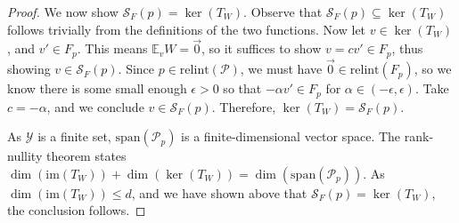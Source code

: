 \documentclass[anon,12pt]{colt2021} %
\newcommand{\Comments}{1}
\newcommand{\mynote}[2]{\ifnum\Comments=1\textcolor{#1}{#2}\fi}
\newcommand{\raf}[1]{\mynote{green}{[RF: #1]}}
\newcommand{\jessie}[1]{\mynote{purple}{[JF: #1]}}
\newcommand{\relint}[1]{\mathrm{relint}(#1)}
\newcommand{\spn}{\mathrm{span}}
\newcommand{\E}{\mathbb{E}}
\renewcommand{\P}{\mathcal{P}}
\newcommand{\Scr}{\mathcal{S}}  %
\newcommand{\Y}{\mathcal{Y}}
\newcommand{\im}{\mathrm{im}}
\begin{document}
\begin{proof}
  We now show $\Scr_F(p) = \ker(T_W)$.
%  
%
  Observe that $\Scr_F(p) \subseteq \ker(T_W)$ follows trivially from the definitions of the two functions. 
  Now let $v \in \ker(T_W)$, and $v' \in F_p$.
  This means $\E_v W = \vec 0$, so it suffices to show $v = c v' \in F_p$, thus showing $v \in \Scr_F(p)$.
  Since $p \in \relint{\P}$, we must have $\vec 0 \in \relint{F_p}$, so we know there is some small enough $\epsilon > 0$ so that $-\alpha v' \in F_p$ for $\alpha \in (-\epsilon, \epsilon)$.
  Take $c = -\alpha$, and we conclude $v \in \Scr_F(p)$.
  Therefore, $\ker(T_W) = \Scr_F(p)$.
  
  As $\Y$ is a finite set, $\spn(\P_p)$ is a finite-dimensional vector space.
  The rank-nullity theorem states $\dim(\im(T_W)) + \dim(\ker(T_W)) = \dim(\spn(\P_p))$.
  As $\dim(\im(T_W)) \leq d$, and we have shown above that $\Scr_F(p) = \ker(T_W)$, the conclusion follows.
\end{proof}
\end{document}
